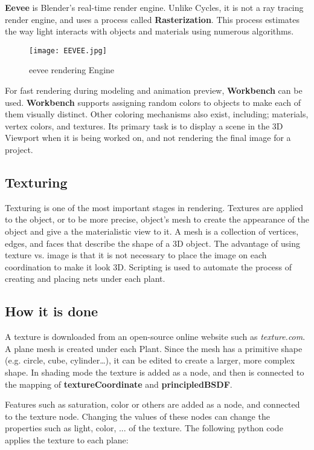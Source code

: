 \documentclass{article}
\begin{document}
\textbf{Eevee} is Blender’s real-time render engine. Unlike Cycles, it is not a ray tracing render engine, and uses a process called \textbf{Rasterization}. This process estimates the way light interacts with objects and materials using numerous algorithms.
\newline
\begin{figure}[htp]
    \centering
    \texttt{[image: EEVEE.jpg]}
    \caption{eevee rendering Engine}
\end{figure}
\par
For fast rendering during modeling and animation preview, \textbf{Workbench} can be used. \textbf{Workbench} supports assigning random colors to objects to make each of them visually distinct. Other coloring mechanisms also exist, including; materials, vertex colors, and textures. Its primary task is to display a scene in the 3D Viewport when it is being worked on, and not rendering the final image for a project.
\newline
\par
\subsection{Texturing}
Texturing is one of the most important stages in rendering. Textures are applied to the object, or to be more precise, object's mesh to create the appearance of the object and give a the materialistic view to it. A mesh is a collection of vertices, edges, and faces that describe the shape of a 3D object. The advantage of using texture vs. image is that it is not necessary to place the image on each coordination to make it look 3D. Scripting is used to automate the process of creating and placing nets under each plant.
\newline
\par
\subsection{How it is done}
A texture is downloaded from an open-source online website such as \textit{texture.com}. A plane mesh is created under each Plant. Since the mesh has a primitive shape (e.g. circle, cube, cylinder…), it can be edited to create a larger, more complex shape. In shading mode the texture is added as a node, and then is connected to the mapping of \textbf{textureCoordinate} and \textbf{principledBSDF}.
\newline
\par
Features such as saturation, color or others are added as a node, and connected to the texture node. Changing the values of these nodes can change the properties such as light, color, ... of the texture. The following python code applies the texture to each plane:
\end{document}
